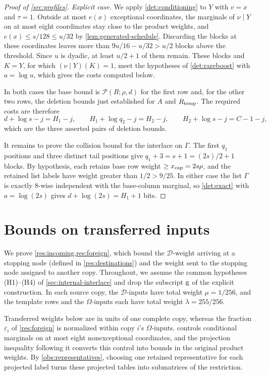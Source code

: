 \documentclass[11pt,letterpaper]{article} \usepackage[utf8]{inputenc}
\theoremstyle{plain} \newtheorem{theorem}{Theorem}[section]
\theoremstyle{definition} \newaliascnt{definition}{theorem}
\newcommand{\RP}[3]{\mathcal{P}(#1;#2,#3)}
\begin{document}
\begin{proof}[Proof of \cref{src:profiles}]
\emph{Explicit case.} We apply \cref{det:conditioning} to $Y$ with $v=x$ and
$\tau=1$. Outside at most $e(x)$ exceptional coordinates, the marginals of
$\nu\mid Y$ on at most eight coordinates stay close to the product weights, and
$e(x)\le s/128\le u/32$ by \cref{lem:generated-schedule}. Discarding the blocks
at these coordinates leaves more than $9u/16-u/32>u/2$ blocks above the
threshold. Since $u$ is dyadic, at least $u/2+1$ of them remain. These blocks
and $K=Y$, for which $(\nu\mid Y)(K)=1$, meet the hypotheses of
\cref{det:rareboost} with $a=\log u$, which gives the costs computed below.

In both cases the base bound is $\RP{R}{\rho}{d}$ for the first row and, for
the other two rows, the deletion bounds just established for $A$ and
$R_{\rm temp}$. The required costs are therefore
\[
d+\log s-j=H_1-j,\qquad
H_1+\log q_2-j=H_2-j,\qquad
H_2+\log s-j=C-1-j,
\]
which are the three asserted pairs of deletion bounds.

It remains to prove the collision bound for the interlace on $\Gamma$.
The first $q_1$ positions and three distinct tail positions give
$q_1+3=s+1=(2s)/2+1$ blocks. By hypothesis, each retains base row weight
$\ge x_{\rm cap}=2s\rho$, and the retained list labels have weight greater
than $1/2>9/25$. In either case the list $\Gamma$ is exactly $8$-wise
independent with the base-column marginal, so \cref{det:exact} with
$a=\log(2s)$ gives $d+\log(2s)=H_1+1$ bits.
\end{proof}

\section{Bounds on transferred inputs}\label{sec:mass-details}
\label{sec:mass_bounds}

We prove \cref{res:incoming,res:foreign}, which bound the $\mathcal D$-weight
arriving at a stopping node (defined in \cref{res:destinations}) and the
weight sent to the stopping node assigned to another copy. Throughout, we
assume the common hypotheses (H1)--(H4) of \cref{sec:internal-interlace} and
drop the subscript $\rm g$ of the explicit construction. In each source copy,
the $\mathcal D$-inputs have total weight $\mu=1/256$, and the template rows
and the $\Omega$-inputs each have total weight $\lambda=255/256$.

Transferred weights below are in units of one complete copy, whereas the
fraction $\varepsilon_i$ of \cref{res:foreign} is normalized within copy $i$'s $\Omega$-inputs.
 controls conditional marginals on at most eight
nonexceptional coordinates, and the projection inequality following it converts
this control into bounds in the original product weights.
By \cref{obs:representatives}, choosing one retained representative for each
projected label turns these projected tables into submatrices of the restriction.
\end{document}
